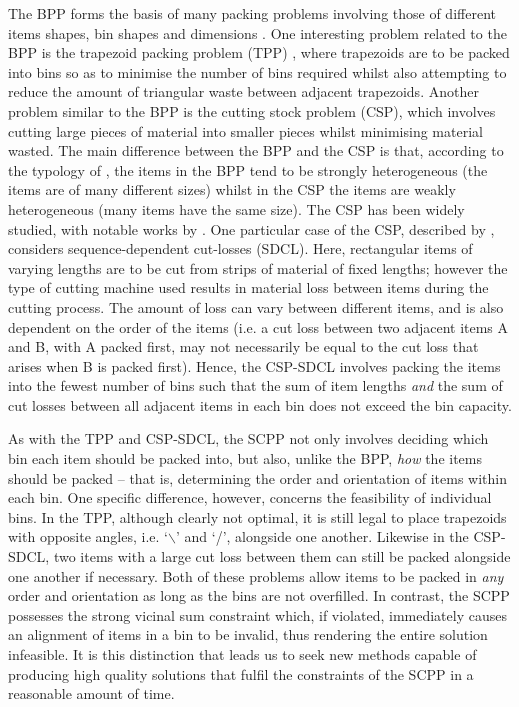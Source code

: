 \documentclass[a4paper,11pt,authoryear]{elsarticle}
\begin{document}
\noindent The BPP forms the basis of many packing problems involving those of different items shapes, bin shapes and dimensions \citep{yuan2021, haouari2009, kenmochi2009, xavier2008, bennell2018, liu2021}. One interesting problem related to the BPP is the trapezoid packing problem (TPP) \citep{lewis2011, lewis2017}, where trapezoids are to be packed into bins so as to minimise the number of bins required whilst also attempting to reduce the amount of triangular waste between adjacent trapezoids. Another problem similar to the BPP is the cutting stock problem (CSP), which involves cutting large pieces of material into smaller pieces whilst minimising material wasted. The main difference between the BPP and the CSP is that, according to the typology of \citet{wascher2007}, the items in the BPP tend to be strongly heterogeneous (the items are of many different sizes) whilst in the CSP the items are weakly heterogeneous (many items have the same size). The CSP has been widely studied, with notable works by \citet{gilmore1961, gilmore1963}. One particular case of the CSP, described by \cite{garraffa2016}, considers sequence-dependent cut-losses (SDCL). Here, rectangular items of varying lengths are to be cut from strips of material of fixed lengths; however the type of cutting machine used results in material loss between items during the cutting process. The amount of loss can vary between different items, and is also dependent on the order of the items (i.e. a cut loss between two adjacent items A and B, with A packed first, may not necessarily be equal to the cut loss that arises when B is packed first). Hence, the CSP-SDCL involves packing the items into the fewest number of bins such that the sum of item lengths \emph{and} the sum of cut losses between all adjacent items in each bin does not exceed the bin capacity.

As with the TPP and CSP-SDCL, the SCPP not only involves deciding which bin each item should be packed into, but also, unlike the BPP, \emph{how} the items should be packed -- that is, determining the order and orientation of items within each bin. One specific difference, however, concerns the feasibility of individual bins. In the TPP, although clearly not optimal, it is still legal to place trapezoids with opposite angles, i.e. `$\backslash$' and `/', alongside one another. Likewise in the CSP-SDCL, two items with a large cut loss between them can still be packed alongside one another if necessary. Both of these problems allow items to be packed in \emph{any} order and orientation as long as the bins are not overfilled. In contrast, the SCPP possesses the strong vicinal sum constraint which, if violated, immediately causes an alignment of items in a bin to be invalid, thus rendering the entire solution infeasible. It is this distinction that leads us to seek new methods capable of producing high quality solutions that fulfil the constraints of the SCPP in a reasonable amount of time.
\end{document}
